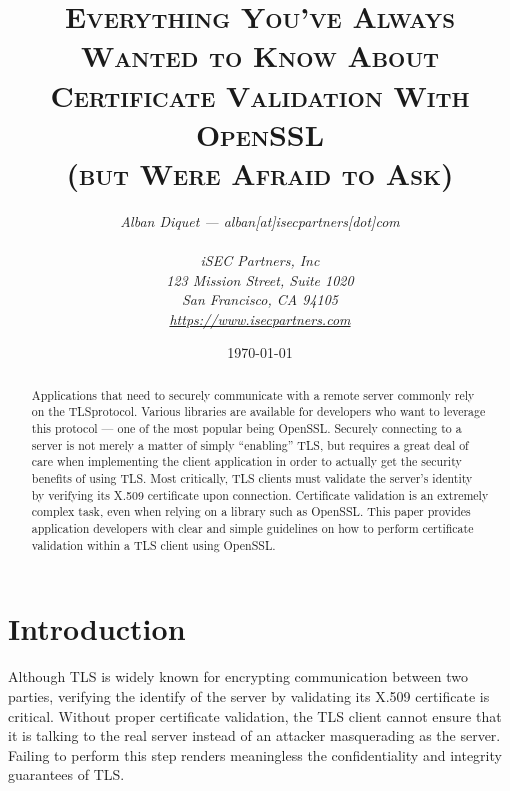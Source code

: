 \documentclass{article}
\title{\scshape Everything You've Always Wanted to Know About Certificate 
    Validation With OpenSSL\\ (but Were Afraid to Ask)}
\author{\em Alban Diquet --- alban[at]isecpartners[dot]com\\
\\
iSEC Partners, Inc\\
123 Mission Street, Suite 1020\\
San Francisco, CA 94105\\
\url{https://www.isecpartners.com}}
\date{\today}
\begin{document}
\maketitle
\thispagestyle{fancy}
\begin{abstract}

Applications that need to securely communicate with a remote server commonly
rely on the TLS\footnotemark protocol. Various libraries are available for 
developers who want to leverage this protocol --- one of the most popular 
being OpenSSL. Securely connecting to a server is not merely a matter of 
simply ``enabling'' TLS, but requires a great deal of care when implementing 
the client application in order to actually get the security benefits of using 
TLS. Most critically, TLS clients must validate the server's identity by 
verifying its X.509 certificate upon connection. Certificate validation is an 
extremely complex task, even when relying on a library such as OpenSSL. This 
paper provides application developers with clear and simple guidelines on how 
to perform certificate validation within a TLS client using OpenSSL.


\end{abstract}

\section{Introduction}

Although TLS is widely known for encrypting communication between two
parties, verifying the identify of the server by validating its X.509
certificate is critical. Without proper certificate validation, the TLS client
cannot ensure that it is talking to the real server instead of an attacker 
masquerading as the server. Failing to perform this step renders meaningless 
the confidentiality and integrity guarantees of TLS\footnotemark.

\end{document}
